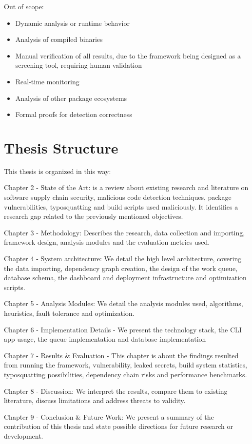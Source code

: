 Out of scope:
\begin{itemize}
	\item Dynamic analysis or runtime behavior
	\item Analysis of compiled binaries
	\item Manual verification of all results, due to the framework being designed as a screening tool, requiring human validation
	\item Real-time monitoring
	\item Analysis of other package ecosystems
	\item Formal proofs for detection correctness
\end{itemize}

\section{Thesis Structure}\label{sect:thesis-structure}

This thesis is organized in this way:

Chapter 2  - State of the Art: is a review about existing research and literature on software supply chain security, malicious code detection techniques, package vulnerabilities, typosquatting and build scripts used maliciously. It identifies a research gap related to the previously mentioned objectives.

Chapter 3 - Methodology: Describes the research, data collection and importing, framework design, analysis modules and the evaluation metrics used.

Chapter 4 - System architecture: We detail the high level architecture, covering the data importing, dependency graph creation, the design of the work queue, database schema, the dashboard and deployment infrastructure and optimization scripts.

Chapter 5 - Analysis Modules: We detail the analysis modules used, algorithms, heuristics, fault tolerance and optimization.

Chapter 6 - Implementation Details - We present the technology stack, the CLI app usage, the queue implementation and database implementation

Chapter 7 - Results \& Evaluation - This chapter is about the findings resulted from running the framework, vulnerability, leaked secrets, build system statistics, typosquatting possibilities, dependency chain risks and performance benchmarks.

Chapter 8 - Discussion: We interpret the results, compare them to existing literature, discuss limitations and address threats to validity.

Chapter 9 - Conclusion \& Future Work: We present a summary of the contribution of this thesis and state possible directions for future research or development.
